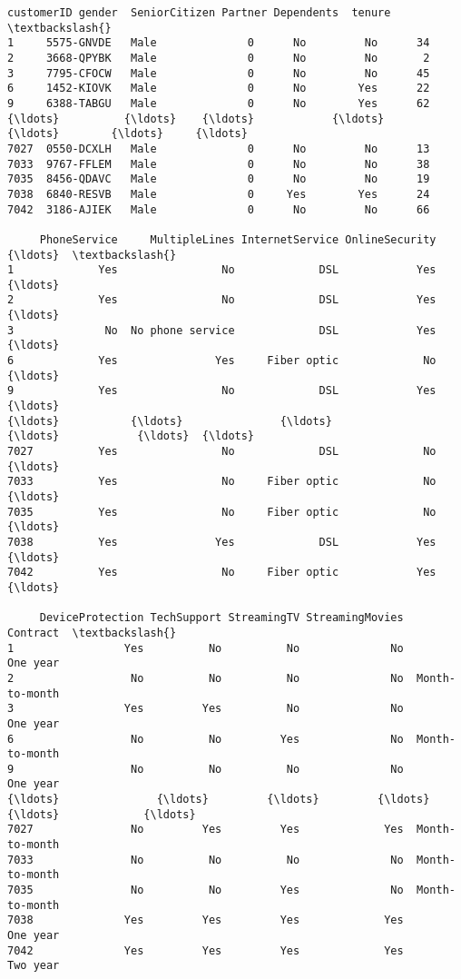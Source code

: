 \documentclass[11pt]{article}
\makeatletter
\newcommand{\boxspacing}{\kern\kvtcb@left@rule\kern\kvtcb@boxsep}
\newcommand{\prompt}[4]{
        {\ttfamily\llap{{\color{#2}[#3]:\hspace{3pt}#4}}\vspace{-\baselineskip}}
    }
\makeatother
\begin{document}
            \begin{tcolorbox}[breakable, size=fbox, boxrule=.5pt, pad at break*=1mm, opacityfill=0]
\prompt{Out}{outcolor}{12}{\boxspacing}
\begin{Verbatim}[commandchars=\\\{\}]
      customerID gender  SeniorCitizen Partner Dependents  tenure  \textbackslash{}
1     5575-GNVDE   Male              0      No         No      34
2     3668-QPYBK   Male              0      No         No       2
3     7795-CFOCW   Male              0      No         No      45
6     1452-KIOVK   Male              0      No        Yes      22
9     6388-TABGU   Male              0      No        Yes      62
{\ldots}          {\ldots}    {\ldots}            {\ldots}     {\ldots}        {\ldots}     {\ldots}
7027  0550-DCXLH   Male              0      No         No      13
7033  9767-FFLEM   Male              0      No         No      38
7035  8456-QDAVC   Male              0      No         No      19
7038  6840-RESVB   Male              0     Yes        Yes      24
7042  3186-AJIEK   Male              0      No         No      66

     PhoneService     MultipleLines InternetService OnlineSecurity  {\ldots}  \textbackslash{}
1             Yes                No             DSL            Yes  {\ldots}
2             Yes                No             DSL            Yes  {\ldots}
3              No  No phone service             DSL            Yes  {\ldots}
6             Yes               Yes     Fiber optic             No  {\ldots}
9             Yes                No             DSL            Yes  {\ldots}
{\ldots}           {\ldots}               {\ldots}             {\ldots}            {\ldots}  {\ldots}
7027          Yes                No             DSL             No  {\ldots}
7033          Yes                No     Fiber optic             No  {\ldots}
7035          Yes                No     Fiber optic             No  {\ldots}
7038          Yes               Yes             DSL            Yes  {\ldots}
7042          Yes                No     Fiber optic            Yes  {\ldots}

     DeviceProtection TechSupport StreamingTV StreamingMovies        Contract  \textbackslash{}
1                 Yes          No          No              No        One year
2                  No          No          No              No  Month-to-month
3                 Yes         Yes          No              No        One year
6                  No          No         Yes              No  Month-to-month
9                  No          No          No              No        One year
{\ldots}               {\ldots}         {\ldots}         {\ldots}             {\ldots}             {\ldots}
7027               No         Yes         Yes             Yes  Month-to-month
7033               No          No          No              No  Month-to-month
7035               No          No         Yes              No  Month-to-month
7038              Yes         Yes         Yes             Yes        One year
7042              Yes         Yes         Yes             Yes        Two year


\end{Verbatim}
\end{tcolorbox}
\end{document}
